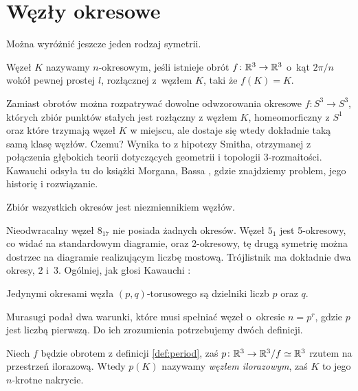 
\section{Węzły okresowe}
%
Można wyróżnić jeszcze jeden rodzaj symetrii.

\begin{definition}
\label{def:period}%
    Węzeł $K$ nazywamy $n$-okresowym, jeśli istnieje obrót $f \colon \mathbb R^3 \to \mathbb R^3$ o~kąt $2\pi/n$ wokół pewnej prostej $l$, rozłącznej z~węzłem $K$, taki że $f(K) = K$.
\end{definition}

Zamiast obrotów można rozpatrywać dowolne odwzorowania okresowe $f \colon S^3 \to S^3$, których zbiór punktów stałych jest rozłączny z węzłem $K$, homeomorficzny z $S^1$ oraz które trzymają węzeł $K$ w miejscu, ale dostaje się wtedy dokładnie taką samą klasę węzłów.
Czemu?
Wynika to z hipotezy Smitha, otrzymanej z połączenia głębokich teorii dotyczących geometrii i topologii 3-rozmaitości.
%
Kawauchi \cite[s. 125]{kawauchi1996} odsyła tu do książki Morgana, Bassa \cite{morgan1984}, gdzie znajdziemy problem, jego historię i rozwiązanie.
%
%

\begin{proposition}
    Zbiór wszystkich okresów jest niezmiennikiem węzłów.
\end{proposition}

Nieodwracalny węzeł $8_{17}$ nie posiada żadnych okresów.
Węzeł $5_1$ jest 5-okresowy, co widać na standardowym diagramie, oraz 2-okresowy, tę drugą symetrię można dostrzec na diagramie realizującym liczbę mostową.
Trójlistnik ma dokładnie dwa okresy, $2$ i~$3$.
Ogólniej, jak głosi Kawauchi \cite[ćwiczenie 10.1.9]{kawauchi1996}:

\begin{proposition}
    Jedynymi okresami węzła $(p, q)$-torusowego są dzielniki liczb $p$ oraz $q$.
\end{proposition}

Murasugi podał dwa warunki, które musi spełniać węzeł o~okresie $n = p^r$, gdzie $p$ jest liczbą pierwszą.
%
Do ich zrozumienia potrzebujemy dwóch definicji.

\begin{definition}
    Niech $f$ będzie obrotem z definicji \ref{def:period}, zaś $p \colon \mathbb R^3 \to \mathbb R^3/f \simeq \mathbb R^3$ rzutem na przestrzeń ilorazową.
%
    Wtedy $p(K)$ nazywamy \emph{węzłem ilorazowym}, zaś $K$ to jego $n$-krotne nakrycie.    
\end{definition}

